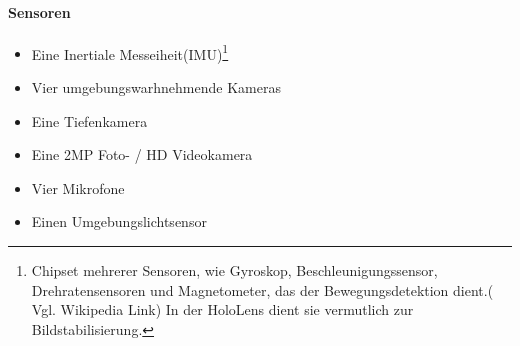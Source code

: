 \paragraph*{Sensoren}
\begin{itemize}
	\item Eine Inertiale Messeiheit(IMU)\footnote{ Chipset mehrerer Sensoren, wie Gyroskop, Beschleunigungssensor, Drehratensensoren und Magnetometer, das der Bewegungsdetektion dient.( Vgl. Wikipedia Link) In der HoloLens dient sie vermutlich zur Bildstabilisierung.}
	\item Vier umgebungswarhnehmende Kameras
	\item Eine Tiefenkamera
	\item Eine 2MP Foto- / HD Videokamera
	\item Vier Mikrofone
	\item Einen Umgebungslichtsensor
\end{itemize}
